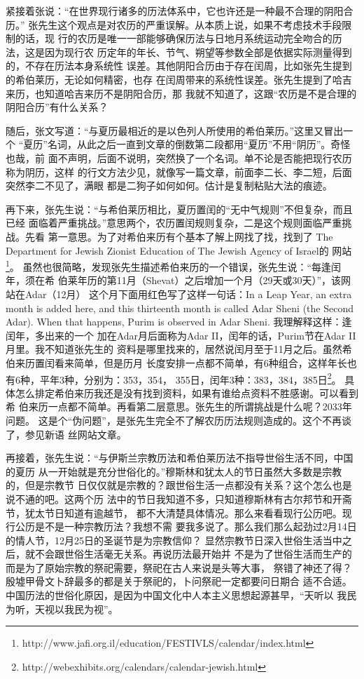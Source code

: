 紧接着张说：“在世界现行诸多的历法体系中，它也许还是一种最不合理的阴阳合历。”
张先生这个观点是对农历的严重误解。从本质上说，如果不考虑技术手段限制的话，现
行的农历是唯一一部能够确保历法与日地月系统运动完全吻合的历法，这是因为现行农
历定年的年长、节气、朔望等参数全部是依据实际测量得到的，不存在历法本身系统性
误差。其他阴阳合历由于存在闰周，比如张先生提到的希伯莱历，无论如何精密，也存
在闰周带来的系统性误差。张先生提到了哈吉来历，也知道哈吉来历不是阴阳合历，那
我就不知道了，这跟“农历是不是合理的阴阳合历”有什么关系？

随后，张文写道：“与夏历最相近的是以色列人所使用的希伯莱历。”这里又冒出一个
“夏历”名词，从此之后一直到文章的倒数第二段都用“夏历”不用“阴历”。奇怪也哉，前
面不声明，后面不说明，突然换了一个名词。单不论是否能把现行农历称为阴历，这样
的行文方法少见，就像写一篇文章，前面李二长、李二短，后面突然李二不见了，满眼
都是二狗子如何如何。估计是复制粘贴大法的痕迹。

再下来，张先生说：“与希伯莱历相比，夏历置闰的“无中气规则”不但复杂，而且已经
面临着严重挑战。”意思两个，农历置闰规则复杂，二是这个规则面临严重挑战。先看
第一意思。为了对希伯来历有个基本了解上网找了找，找到了
The Department for Jewish Zionist Education of The Jewish Agency of Israel的
网站\footnote{http://www.jafi.org.il/education/FESTIVLS/calendar/index.html}。
虽然也很简略，发现张先生描述希伯来历的一个错误，张先生说：“每逢闰年，须在希
伯莱年历的第11月（Shevat）之后增加一个月（29天或30天）”，该网站在Adar（12月）
这个月下面用红色写了这样一句话：In a Leap Year, an extra month is added here,
and this thirteenth month is called Adar Sheni (the Second Adar). When that
happens, Purim is observed in Adar Sheni. 我理解释这样：逢闰年，多出来的一个
加在Adar月后面称为Adar II，闰年的话，Purim节在Adar II月里。我不知道张先生的
资料是哪里找来的，居然说闰月至于11月之后。虽然希伯来历置闰看来简单，但是历月
长度安排一点都不简单，有6种组合，这样年长也有6种，平年3种，分别为：353，354，
355日，闰年3种：383，384，385日\footnote{http://webexhibits.org/calendars/calendar-jewish.html}。
具体怎么排定希伯来历我还是没有找到资料，如果有谁给点资料不胜感谢。可以看到希
伯来历一点都不简单。再看第二层意思。张先生的所谓挑战是什么呢？2033年问题。
这是个“伪问题”，是张先生完全不了解农历历法规则造成的。这个不再谈了，参见新语
丝网站文章。

再接着，张先生说：“与伊斯兰宗教历法和希伯莱历法不指导世俗生活不同，中国的夏历
从一开始就是充分世俗化的。”穆斯林和犹太人的节日虽然大多数是宗教的，但是宗教节
日仅仅就是宗教的？跟世俗生活一点都没有关系？这个怎么也是说不通的吧。这两个历
法中的节日我知道不多，只知道穆斯林有古尔邦节和开斋节，犹太节日知道有逾越节，
都不大清楚具体情况。那么来看看现行公历吧。现行公历是不是一种宗教历法？我想不需
要我多说了。那么我们那么起劲过2月14日的情人节，12月25日的圣诞节是为宗教信仰？
显然宗教节日深入世俗生活当中之后，就不会跟世俗生活毫无关系。再说历法最开始并
不是为了世俗生活而生产的而是为了原始宗教的祭祀需要，祭祀在古人来说是头等大事，
祭错了神还了得？殷墟甲骨文卜辞最多的都是关于祭祀的，卜问祭祀一定都要问日期合
适不合适。中国历法的世俗化原因，是因为中国文化中人本主义思想起源甚早，“天听以
我民为听，天视以我民为视”。

